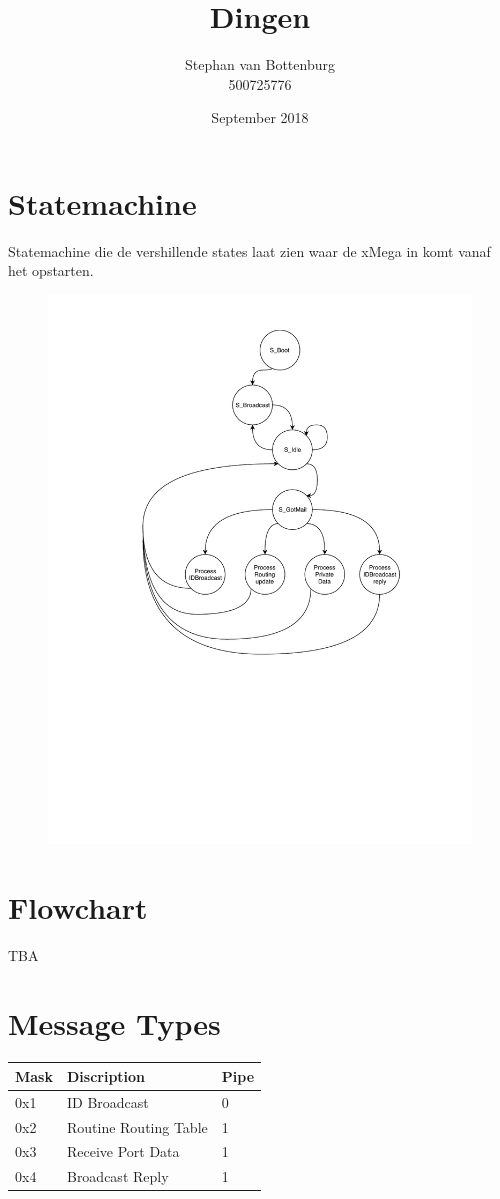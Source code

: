 \documentclass{article}
\title{Dingen}
\author{Stephan van Bottenburg\\500725776}
\date{September 2018}
\begin{document}
\maketitle
\clearpage
{}
\clearpage

\section*{Statemachine}
Statemachine die de vershillende states laat zien waar de xMega in komt vanaf het opstarten.

\begin{figure}[h]
	\includegraphics[width=.8\textwidth, keepaspectratio]{media/Pstate.pdf}
    \caption{}
\end{figure}

\section*{Flowchart}
TBA
\section*{Message Types}
\begin{table}[h]
\begin{tabular}{|l|l|l|}
\hline
\rowcolor[HTML]{EFEFEF} 
Mask & Discription           & Pipe \\ \hline
0x1  & ID Broadcast          & 0    \\ \hline
0x2  & Routine Routing Table & 1    \\ \hline
0x3  & Receive Port Data     & 1    \\ \hline
0x4  & Broadcast Reply       & 1    \\ \hline
\end{tabular}
\end{table}
\end{document}

